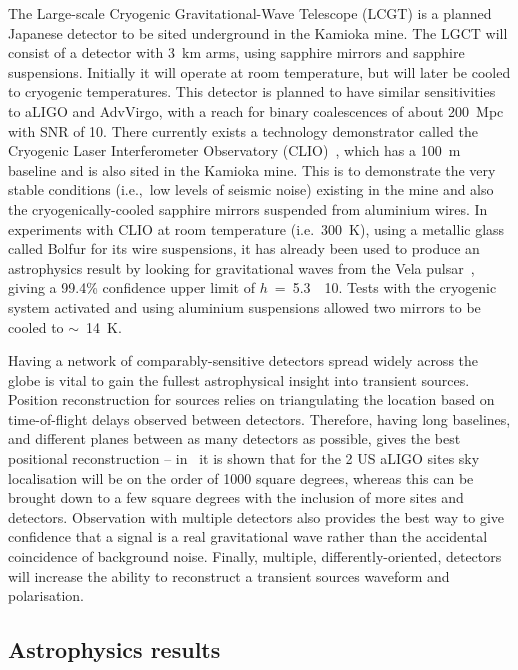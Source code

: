 The Large-scale Cryogenic Gravitational-Wave Telescope (LCGT)
\cite{Miyoki:2005, Ohashi:2008, Kuroda:2010} is a planned Japanese detector to
be sited underground in the Kamioka mine. The LGCT will consist of a detector
with 3~km arms, using sapphire mirrors and sapphire suspensions. Initially it
will operate at room temperature, but will later be cooled to cryogenic
temperatures. This detector is planned to have similar sensitivities
to aLIGO and AdvVirgo, with a reach for binary coalescences of about 200~Mpc
with SNR of 10. There currently exists a technology demonstrator called the
Cryogenic Laser Interferometer Observatory (CLIO)~\cite{Yamamoto:2008, CLIOweb},
which has a 100~m baseline and is also sited in the Kamioka mine. This is to
demonstrate the very stable conditions (i.e.,\ low levels of seismic noise)
existing in the mine and also the cryogenically-cooled sapphire mirrors
suspended from aluminium wires. In experiments with CLIO at room temperature
(i.e.\, 300~K), using a metallic glass called Bolfur for its wire suspensions, it
has already been used to produce an astrophysics result by looking for
gravitational waves from the Vela pulsar~\cite{Akutsu:2008}, giving a 99.4\%
confidence upper limit of $h$~=~5.3~\texttimes~10. Tests with the cryogenic
system activated and using aluminium suspensions allowed two mirrors to be
cooled to $\sim$~14~K.


Having a network of comparably-sensitive detectors spread widely across the
globe is vital to gain the fullest astrophysical insight into transient sources.
Position reconstruction for sources relies on triangulating the location based
on time-of-flight delays observed between detectors. Therefore, having long
baselines, and different planes between as many detectors as possible, gives the
best positional reconstruction -- in~\cite{Fairhurst:2010} it is shown that for
the 2 US aLIGO sites sky localisation will be on the order of 1000 square degrees,
whereas this can be brought down to a few square degrees with the inclusion of
more sites and detectors. Observation with multiple detectors also provides the
best way to give confidence that a signal is a real gravitational wave rather
than the accidental coincidence of background noise. Finally, multiple,
differently-oriented, detectors will increase the ability to reconstruct a
transient sources waveform and polarisation.

\subsection{Astrophysics results}
\label{subsection:results}

